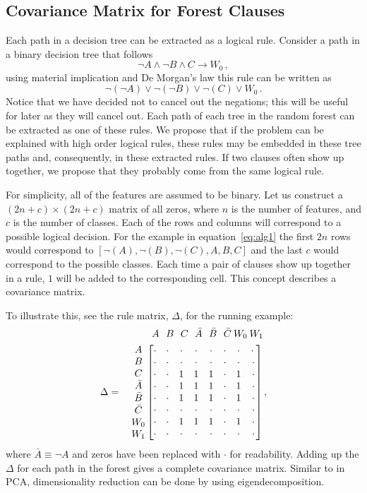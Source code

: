 \documentclass[11pt]{article}
\begin{document}
\subsection{Covariance Matrix for Forest Clauses}
Each path in a decision tree can be extracted as a logical rule. Consider a path in a binary decision tree that follows 
\[\neg A \land \neg B \land C \rightarrow W_0 \,,\]
using material implication and De Morgan's law this rule can be written as 
\begin{equation}
\neg(\neg A) \lor \neg (\neg B) \lor \neg(C) \lor W_0 \, .
\label{eq:alg1}
\end{equation}
Notice that we have decided not to cancel out the negations; this will be useful for later as they will cancel out. Each path of each tree in the random forest can be extracted as one of these rules. We propose that if the problem can be explained with high order logical rules, these rules may be embedded in these tree paths and, consequently, in these extracted rules. If two clauses often show up together, we propose that they probably come from the same logical rule.  

For simplicity, all of the features are assumed to be binary. Let us construct a $(2n +c) \times (2n+c)$ matrix of all zeros, where $n$ is the number of features, and $c$ is the number of classes. Each of the rows and columns will correspond to a possible logical decision. For the example in equation~\ref{eq:alg1} the first $2n$ rows would correspond to $[\neg(A), \neg(B), \neg(C), A, B, C]$ and the last $c$ would correspond to the possible classes. Each time a pair of clauses show up together in a rule, $1$ will be added to the corresponding cell. This concept describes a covariance matrix.

To illustrate this, see the rule matrix, $\Delta$, for the running example:
\begin{align*}
&\;\:A\:\:\:B\:\:\:C\:\:\:\bar{A}\:\:\:\bar{B}\:\:\:\bar{C}\:W_0\:W_1\\
\Delta = \quad \mqty{A\\B\\C\\\bar{A}\\\bar{B}\\\bar{C}\\W_0\\W_1}\, &\mqty[\cdot&\cdot&\cdot&\cdot&\cdot&\cdot&\cdot&\cdot\:\\\cdot&\cdot&\cdot&\cdot&\cdot&\cdot&\cdot&\cdot\\\cdot&\cdot&1&1&1&\cdot&1&\cdot\\\cdot&\cdot&1&1&1&\cdot&1&\cdot\\\cdot&\cdot&1&1&1&\cdot&1&\cdot\\\cdot&\cdot&\cdot&\cdot&\cdot&\cdot&\cdot&\cdot\\\cdot&\cdot&1&1&1&\cdot&1&\cdot\\\cdot&\cdot&\cdot&\cdot&\cdot&\cdot&\cdot&\cdot] \, ,
\end{align*}
where $\bar{A} \equiv \neg A$ and zeros have been replaced with $\cdot$ for readability. Adding up the $\Delta$ for each path in the forest gives a complete covariance matrix. Similar to in PCA, dimensionality reduction can be done by using eigendecomposition.
\end{document}
